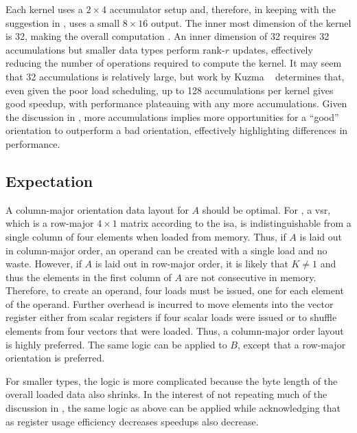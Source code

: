 \documentclass[\main/thesis.tex]{subfiles}
\begin{document}
Each kernel uses a $2 \times 4$ accumulator setup and, therefore, in keeping with the suggestion in , uses a small $8 \times 16$ output.
The inner most dimension of the kernel is 32, making the overall computation .
An inner dimension of 32 requires 32 accumulations but smaller data types perform rank-$r$ updates, effectively reducing the number of operations required to compute the kernel.
It may seem that 32 accumulations is relatively large, but work by Kuzma \etal~\autocite{kuzma2021fast} determines that, even given the poor load scheduling, up to 128 accumulations per kernel gives good speedup, with performance plateauing with any more accumulations.
Given the discussion in , more accumulations implies more opportunities for a ``good'' orientation to outperform a bad orientation, effectively highlighting differences in performance.

\subsection{Expectation}
\label{sec:orderExpectation}
A column-major orientation data layout for $A$ should be optimal.
For , a \gls{vsr}, which is a row-major $4 \times 1$ matrix according to the \gls{isa}, is indistinguishable from a single column of four elements when loaded from memory.
Thus, if $A$ is laid out in column-major order, an operand can be created with a single load and no waste.
However, if $A$ is laid out in row-major order, it is likely that $K \ne 1$ and thus the elements in the first column of $A$ are not consecutive in memory.
Therefore, to create an operand, four loads must be issued, one for each element of the operand.
Further overhead is incurred to move elements into the vector register either from scalar registers if four scalar loads were issued or to shuffle elements from four vectors that were loaded.
Thus, a column-major order layout is highly preferred.
The same logic can be applied to $B$, except that a row-major orientation is preferred.

For smaller types, the logic is more complicated because the byte length of the overall loaded data also shrinks.
In the interest of not repeating much of the discussion in , the same logic as above can be applied while acknowledging that as register usage efficiency decreases speedups also decrease.
\end{document}
